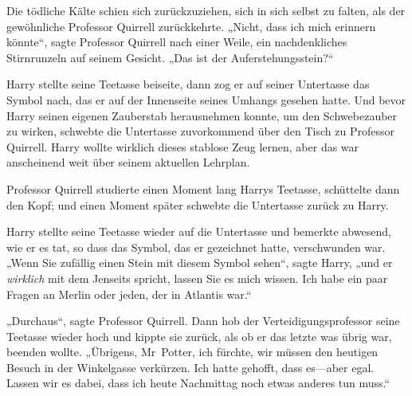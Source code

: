 Die tödliche Kälte schien sich zurückzuziehen, sich in sich selbst zu falten, als der gewöhnliche Professor Quirrell zurückkehrte.
„Nicht, dass ich mich erinnern könnte“, sagte Professor Quirrell nach einer Weile, ein nachdenkliches Stirnrunzeln auf seinem Gesicht.
„Das ist der Auferstehungsstein?“

Harry stellte seine Teetasse beiseite, dann zog er auf seiner Untertasse das Symbol nach, das er auf der Innenseite seines Umhangs gesehen hatte. Und bevor Harry seinen eigenen Zauberstab herausnehmen konnte, um den Schwebezauber zu wirken, schwebte die Untertasse zuvorkommend über den Tisch zu Professor Quirrell. Harry wollte wirklich dieses stablose Zeug lernen, aber das war anscheinend weit über seinem aktuellen Lehrplan.

Professor Quirrell studierte einen Moment lang Harrys Teetasse, schüttelte dann den Kopf; und einen Moment später schwebte die Untertasse zurück zu Harry.

Harry stellte seine Teetasse wieder auf die Untertasse und bemerkte abwesend, wie er es tat, so dass das Symbol, das er gezeichnet hatte, verschwunden war.
„Wenn Sie zufällig einen Stein mit diesem Symbol sehen“, sagte Harry, „und er \emph{wirklich} mit dem Jenseits spricht, lassen Sie es mich wissen. Ich habe ein paar Fragen an Merlin oder jeden, der in Atlantis war.“

„Durchaus“, sagte Professor Quirrell. Dann hob der Verteidigungsprofessor seine Teetasse wieder hoch und kippte sie zurück, als ob er das letzte was übrig war, beenden wollte. „Übrigens, Mr~Potter, ich fürchte, wir müssen den heutigen Besuch in der Winkelgasse verkürzen. Ich hatte gehofft, dass es—aber egal. Lassen wir es dabei, dass ich heute Nachmittag noch etwas anderes tun muss.“

